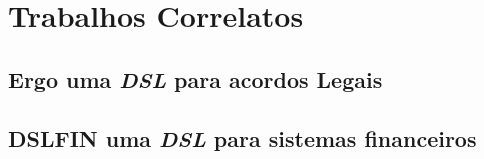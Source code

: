 \section{Trabalhos Correlatos}
\label{subsection:trabalhoscorrelatos}


\subsection{Ergo uma \textit{DSL} para acordos Legais}
\label{ergo}


\subsection{DSLFIN uma \textit{DSL} para sistemas financeiros}
\label{dslfin}
